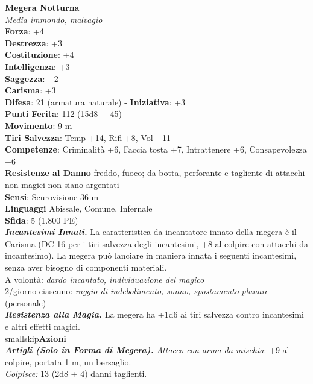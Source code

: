 \begin{multicols}{2}
\medskip\textbf{Megera Notturna}\\
\emph{Media immondo, malvagio}\\
\textbf{Forza}: +4\\
\textbf{Destrezza}: +3\\
\textbf{Costituzione}: +4\\
\textbf{Intelligenza}: +3\\
\textbf{Saggezza}: +2\\
\textbf{Carisma}: +3\\
\textbf{Difesa}: 21 (armatura naturale) - \textbf{Iniziativa}: +3\\
\textbf{Punti Ferita}: 112 (15d8 + 45)\\
\textbf{Movimento}: 9 m\\
\textbf{Tiri Salvezza}: Temp +14, Rifl +8, Vol +11\\
\textbf{Competenze}: Criminalità +6, Faccia tosta +7, Intrattenere +6, Consapevolezza +6\\
\textbf{Resistenze al Danno} freddo, fuoco; da botta, perforante e tagliente di attacchi non magici non siano argentati\\
\textbf{Sensi}: Scurovisione 36 m\\
\textbf{Linguaggi} Abissale, Comune, Infernale\\
\textbf{Sfida}: 5 (1.800 PE)\smallskip\\

\emph{\textbf{Incantesimi Innati.}} La caratteristica da incantatore innato della megera è il Carisma (DC  16 per i tiri salvezza degli incantesimi, +8 al colpire con attacchi da incantesimo). La megera può lanciare in maniera innata i seguenti incantesimi, senza aver bisogno di componenti materiali.\\

A volontà: \emph{dardo incantato, individuazione del magico}\\
2/giorno ciascuno: \emph{raggio di indebolimento, sonno, spostamento} \emph{planare} (personale)\\
\emph{\textbf{Resistenza alla Magia.}} La megera ha +1d6 ai tiri salvezza contro incantesimi e altri effetti magici.\\
smallskip\textbf{Azioni}\\
\emph{\textbf{Artigli (Solo in Forma di Megera).} Attacco con arma da mischia}: +9 al colpire, portata 1 m, un bersaglio.\\
\emph{Colpisce:} 13 (2d8 + 4) danni taglienti.\\


\end{multicols}
